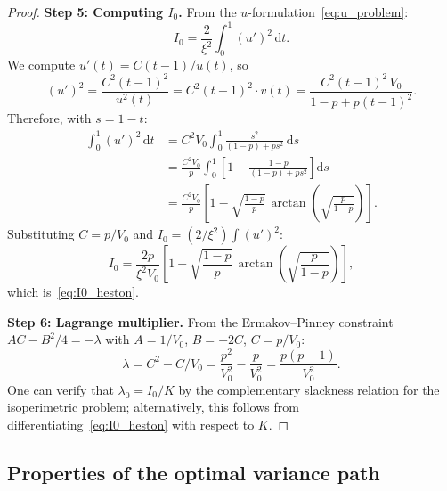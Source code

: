 \documentclass[11pt]{article}
\theoremstyle{definition}
\newcommand{\dd}{\mathrm{d}}
\begin{document}
\begin{proof}
\textbf{Step 5: Computing $I_0$.}
From the $u$-formulation~\eqref{eq:u_problem}:
\begin{equation}
  I_0 = \frac{2}{\xi^2}\int_0^1 (u')^2\,\dd t.
\end{equation}
We compute $u'(t) = C(t-1)/u(t)$, so
\begin{equation}
  (u')^2 = \frac{C^2(t-1)^2}{u^2(t)} = C^2(t-1)^2\cdot v(t) = \frac{C^2(t-1)^2\,V_0}{1 - p + p(t-1)^2}.
\end{equation}
Therefore, with $s = 1-t$:
\begin{align}
  \int_0^1 (u')^2\,\dd t &= C^2 V_0\int_0^1 \frac{s^2}{(1-p) + ps^2}\,\dd s \\
  &= \frac{C^2 V_0}{p}\int_0^1\left[1 - \frac{1-p}{(1-p)+ps^2}\right]\dd s \\
  &= \frac{C^2 V_0}{p}\left[1 - \sqrt{\frac{1-p}{p}}\,\arctan\!\left(\sqrt{\frac{p}{1-p}}\right)\right].
\end{align}
Substituting $C = p/V_0$ and $I_0 = (2/\xi^2)\int(u')^2$:
\begin{equation}
  I_0 = \frac{2p}{\xi^2 V_0}\left[1 - \sqrt{\frac{1-p}{p}}\,\arctan\!\left(\sqrt{\frac{p}{1-p}}\right)\right],
\end{equation}
which is~\eqref{eq:I0_heston}.

\textbf{Step 6: Lagrange multiplier.}
From the Ermakov--Pinney constraint $AC - B^2/4 = -\lambda$ with $A = 1/V_0$, $B = -2C$, $C = p/V_0$:
\begin{equation}
  \lambda = C^2 - C/V_0 = \frac{p^2}{V_0^2} - \frac{p}{V_0^2} = \frac{p(p-1)}{V_0^2}.
\end{equation}
One can verify that $\lambda_0 = I_0/K$ by the complementary slackness relation for the isoperimetric problem; alternatively, this follows from differentiating~\eqref{eq:I0_heston} with respect to $K$.
\end{proof}

\subsection{Properties of the optimal variance path}\label{sec:v_properties}
\end{document}
